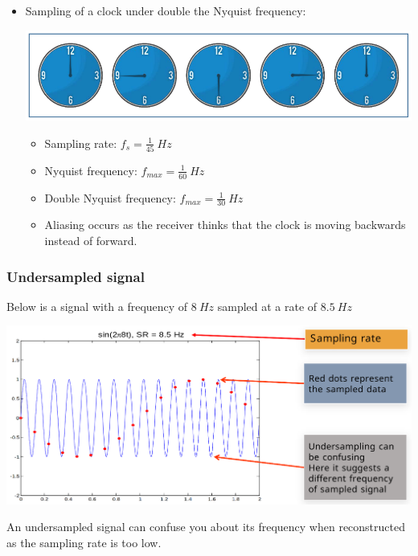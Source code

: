 \documentclass[11pt]{article}
\begin{document}
 \newpage

\begin{itemize}
\item Sampling of a clock under double the Nyquist frequency:
\begin{center}
\includegraphics[width=.9\linewidth]{./images/sampling-clock-under-double-nyquist-frequency.png}
\end{center}

\begin{itemize}
\item Sampling rate: \(f_s = \frac{1}{45} \ \unit{Hz}\)
\item Nyquist frequency: \(f_{max} = \frac{1}{60} \ \unit{Hz}\)
\item Double Nyquist frequency: \(f_{max} = \frac{1}{30} \ \unit{Hz}\)
\item Aliasing occurs as the receiver thinks that the clock is moving backwards instead of forward.
\end{itemize}
\end{itemize}

 \newpage
\subsubsection{Undersampled signal}
\label{sec:org79a959e}
Below is a signal with a frequency of \(\qty{8}{Hz}\) sampled at a rate of \(\qty{8.5}{Hz}\)
\begin{center}
\includegraphics[width=.9\linewidth]{./images/sampling-undersampled-signal.png}
\end{center}

An undersampled signal can confuse you about its frequency when reconstructed as the sampling rate is too low.
\end{document}

